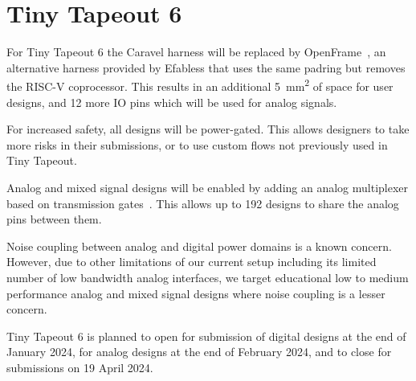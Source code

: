 \section{Tiny Tapeout 6}
\label{sec:tinytapeout6}

For Tiny Tapeout 6 the Caravel harness will be replaced by OpenFrame~\cite{openframe}, an alternative harness provided by Efabless that uses the same padring but removes the RISC-V coprocessor.
This results in an additional \qty{5}{\mm\squared} of space for user designs, and 12 more IO pins which will be used for analog signals.

For increased safety, all designs will be power-gated. This allows designers to take more risks in their submissions, or to use custom flows not previously used in Tiny Tapeout.

Analog and mixed signal designs will be enabled by adding an analog multiplexer based on transmission gates~\cite{transmissiongates}. 
This allows up to 192 designs to share the analog pins between them.

Noise coupling between analog and digital power domains is a known concern. However, due to other limitations of our current setup including its limited number of low bandwidth analog interfaces, we target educational low to medium performance analog and mixed signal designs where noise coupling is a lesser concern.

Tiny Tapeout 6 is planned to open for submission of digital designs at the end of January 2024, for analog designs at the end of February 2024, and to close for submissions on 19 April 2024.
